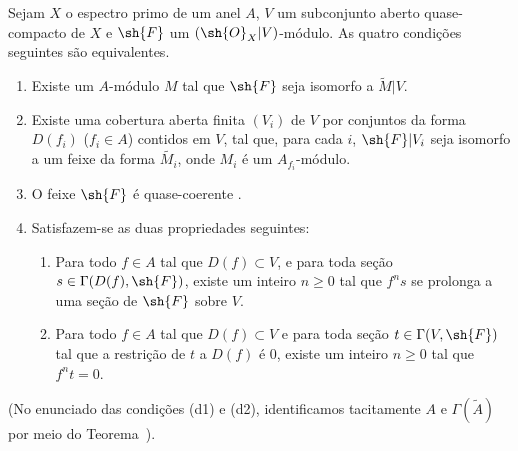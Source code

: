 \documentclass[oneside]{amsart}
\renewcommand{\geq}{\geqslant}
\let\EGAOriginalLabel\label
\renewcommand{\label}[1]{\phantomsection\EGAOriginalLabel{#1}}
\begin{document}
\begin{theorem}[1.4.1]
\label{I.1.4.1}
Sejam $X$ o espectro primo de um anel $A$, $V$ um subconjunto aberto quase-compacto de $X$ e $\sh{F}$ um $(\sh{O}_X|V)$-módulo.
As quatro condições seguintes são equivalentes.
\begin{enumerate}
  \item[{\rm(a)}] Existe um $A$-módulo $M$ tal que $\sh{F}$ seja isomorfo a $\widetilde{M}|V$.
  \item[{\rm(b)}] Existe uma cobertura aberta finita $(V_i)$ de $V$ por conjuntos da forma $D(f_i)$ ($f_i\in A$) contidos em $V$, tal que, para cada $i$, $\sh{F}|V_i$ seja isomorfo a um feixe da forma $\widetilde{M_i}$, onde $M_i$ é um $A_{f_i}$-módulo.
  \item[{\rm(c)}] O feixe $\sh{F}$ é quase-coerente .
  \item[{\rm(d)}] Satisfazem-se as duas propriedades seguintes:
    \begin{enumerate}
      \item[{\rm(d1)}] Para todo $f\in A$ tal que $D(f)\subset V$, e para toda seção $s\in\Gamma(D(f),\sh{F})$, existe um inteiro $n\geq 0$ tal que $f^n s$ se prolonga a uma seção de $\sh{F}$ sobre $V$.
      \item[{\rm(d2)}] Para todo $f\in A$ tal que $D(f)\subset V$ e para toda seção $t\in\Gamma(V,\sh{F})$ tal que a restrição de $t$ a $D(f)$ é $0$, existe um inteiro $n\geq 0$ tal que $f^n t=0$.
    \end{enumerate}
\end{enumerate}
\end{theorem}
(No enunciado das condições (d1) e (d2), identificamos tacitamente $A$ e $\Gamma(\widetilde{A})$ por meio do Teorema~).
\end{document}
